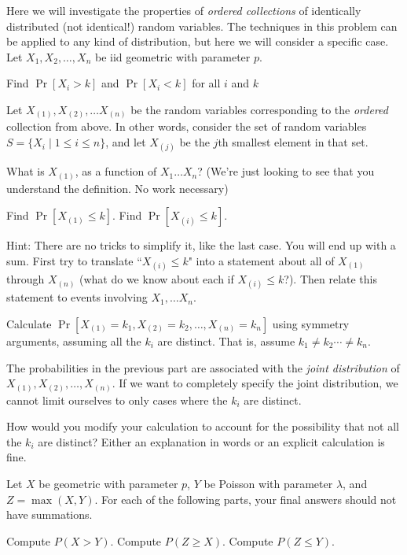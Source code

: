 
Here we will investigate the properties of \textit{ordered collections} of identically distributed (not identical!) random variables. The techniques in this problem can be applied to any kind of distribution, but here we will consider a specific case. Let $X_1, X_2, \ldots, X_n$ be $\mathrm{iid}$ geometric with parameter $p$. 
\begin{Parts}
    \Part Find $\Pr[X_i > k]$ and $\Pr[X_i < k]$ for all $i$ and $k$ 

    \Part Let $X_{(1)}, X_{(2)}, \ldots X_{(n)}$ be the random variables corresponding to the \textit{ordered} collection from above. In other words, consider the set of random variables $S = \{ X_i \mid 1 \leq i \leq n\}$, and let $X_{(j)}$ be the $j$th smallest element in that set. 
    
    What is $X_{(1)}$, as a function of $X_1 \ldots X_n$? (We're just looking to see that you understand the definition. No work necessary)
    
    \Part Find $\Pr[X_{(1)} \leq k]$.
    \Part Find $\Pr[X_{(i)} \leq k]$. 

    Hint: There are no tricks to simplify it, like the last case. You will end up with a sum. First try to translate ``$X_{(i)} \leq k$" into a statement about all of $X_{(1)}$ through $X_{(n)}$ (what do we know about each if $X_{(i)} \leq k$?). Then relate this statement to events involving $X_1, \ldots X_n$. 
    
    \Part Calculate $\Pr[X_{(1)} = k_1, X_{(2)} = k_2, \ldots, X_{(n)} = k_n]$ using symmetry arguments, assuming all the $k_i$ are distinct. That is, assume $k_1 \neq k_2 \cdots \neq k_n$.

    \Part The probabilities in the previous part are associated with the \textit{joint distribution} of $X_{(1)}, X_{(2)}, \ldots, X_{(n)}$. If we want to completely specify the joint distribution, we cannot limit ourselves to only cases where the $k_i$ are distinct. 

    How would you modify your calculation to account for the possibility that not all the $k_i$ are distinct? Either an explanation in words or an explicit calculation is fine.
    
\end{Parts}

Let $X$ be geometric with parameter $p$, $Y$ be Poisson with parameter $\lambda$, and $Z=\max(X,Y)$. For each of the following parts, your final answers should not have summations.

\begin{Parts}
    \Part Compute $P(X>Y)$.
    \Part Compute $P(Z\geq X)$.
    \Part Compute $P(Z\leq Y)$.
\end{Parts}

